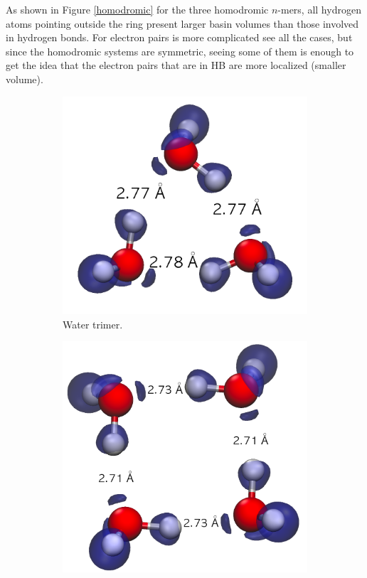 As shown in Figure \ref{homodromic} for the three homodromic $n$-mers, all
hydrogen atoms pointing outside the ring present larger basin volumes than those
involved in hydrogen bonds. For electron pairs is more complicated see all the
cases, but since the homodromic systems are symmetric, seeing some of them is
enough to get the idea that the electron pairs that are in HB are more
localized (smaller volume).

\begin{figure}[h]
\centering
\begin{subfigure}[b]{0.32\linewidth}
\includegraphics[width=\linewidth]{4/plots/elf/new/trimerELF}
\caption{Water trimer.}
\end{subfigure}
\begin{subfigure}[b]{0.32\linewidth}
\includegraphics[width=\linewidth]{4/plots/elf/new/tetramer}

\end{subfigure}
\end{figure}
